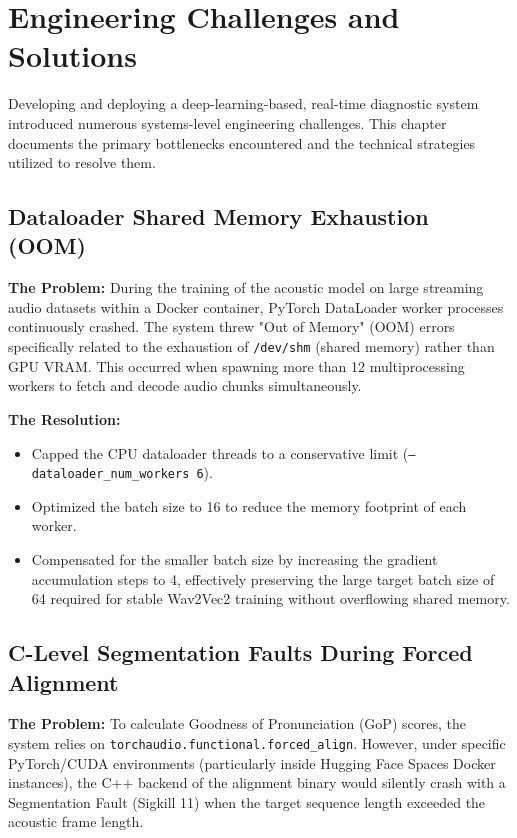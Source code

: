 \chapter{Engineering Challenges and Solutions}

Developing and deploying a deep-learning-based, real-time diagnostic system introduced numerous systems-level engineering challenges. This chapter documents the primary bottlenecks encountered and the technical strategies utilized to resolve them.

\section{Dataloader Shared Memory Exhaustion (OOM)}
\textbf{The Problem:} During the training of the acoustic model on large streaming audio datasets within a Docker container, PyTorch DataLoader worker processes continuously crashed. The system threw "Out of Memory" (OOM) errors specifically related to the exhaustion of \texttt{/dev/shm} (shared memory) rather than GPU VRAM. This occurred when spawning more than 12 multiprocessing workers to fetch and decode audio chunks simultaneously.

\textbf{The Resolution:} 
\begin{itemize}
    \item Capped the CPU dataloader threads to a conservative limit (\texttt{--dataloader\_num\_workers 6}).
    \item Optimized the batch size to 16 to reduce the memory footprint of each worker.
    \item Compensated for the smaller batch size by increasing the gradient accumulation steps to 4, effectively preserving the large target batch size of 64 required for stable Wav2Vec2 training without overflowing shared memory.
\end{itemize}

\section{C-Level Segmentation Faults During Forced Alignment}
\textbf{The Problem:} To calculate Goodness of Pronunciation (GoP) scores, the system relies on \texttt{torchaudio.functional.forced\_align}. However, under specific PyTorch/CUDA environments (particularly inside Hugging Face Spaces Docker instances), the C++ backend of the alignment binary would silently crash with a Segmentation Fault (Sigkill 11) when the target sequence length exceeded the acoustic frame length.

